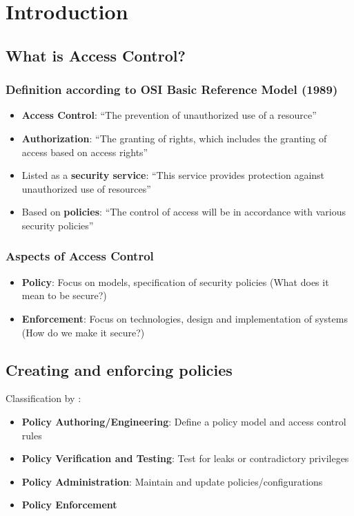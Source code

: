 \documentclass[12pt,A4]{extarticle}
\begin{document}
\disclaimer

\tableofcontents
\clearpage

\section{Introduction}
\subsection{What is Access Control?}
\subsubsection{Definition according to OSI Basic Reference Model (1989)}
\begin{itemize}
  \item{\textbf{Access Control}: ``The prevention of unauthorized use of a resource''}
  \item{\textbf{Authorization}: ``The granting of rights, which includes the granting of access based on access rights''}
  \item{Listed as a \textbf{security service}: ``This service provides protection against unauthorized use of resources''}
  \item{Based on \textbf{policies}: ``The control of access will be in accordance with various security policies''}
\end{itemize}

\subsubsection{Aspects of Access Control}
\begin{itemize}
  \item{\textbf{Policy}: Focus on models, specification of security policies (What does it mean to be secure?)}
  \item{\textbf{Enforcement}: Focus on technologies, design and implementation of systems (How do we make it secure?)}
\end{itemize}

\subsection{Creating and enforcing policies}
Classification by \cite{nobi2022towards}:
\begin{itemize}
  \item{\textbf{Policy Authoring/Engineering}: Define a policy model and access control rules}
  \item{\textbf{Policy Verification and Testing}: Test for leaks or contradictory privileges}
  \item{\textbf{Policy Administration}: Maintain and update policies/configurations}
  \item{\textbf{Policy Enforcement}}
\end{itemize}


\newpage


\end{document}
